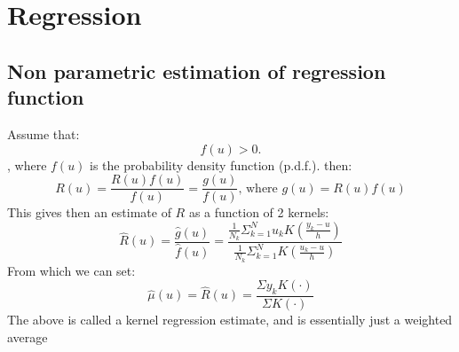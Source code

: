 \chapter{Regression}

%
%
%
%


\section{Non parametric estimation of regression function}
Assume that:
\[
f(u) > 0
.\], where $f(u)$ is the probability density function (p.d.f.). then:
\begin{equation}
        R(u) = \frac{R(u)f(u)}{f(u)} = \frac{g(u)}{f(u)} \text{, where } g(u) = R(u)f(u)
\end{equation}
This gives then an estimate of $R$ as a function of 2 kernels:
 \begin{equation}
     \hat{R}(u) = \frac{\hat{g}(u)}{\hat{f}(u)} = \frac{ \frac{1}{N_k}\Sigma^{N}_{k=1}u_kK( \frac{y_k-u}{h})  }{   \frac{1}{N_k}\Sigma^{N}_{k=1}K( \frac{u_k-u}{h})   }
\end{equation}
From which we can set:
\begin{equation}
    \hat{\mu}(u) = \hat{R}(u) = \frac{\Sigma y_k K(\cdot)}{\Sigma K(\cdot)}
\end{equation}
The above is called a kernel regression estimate, and is essentially just a weighted average



